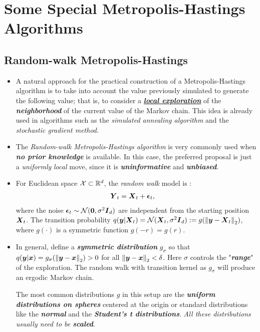 \documentclass[11pt]{article}
\begin{document}
\section{Some Special Metropolis-Hastings Algorithms}
\subsection{Random-walk Metropolis-Hastings}
\begin{itemize}
\item A natural approach for the practical construction of a Metropolis-Hastings algorithm is to take into account the value previously simulated to generate the following value; that is, to consider a \underline{\emph{\textbf{local exploration}}} of the \emph{\textbf{neighborhood}} of the current value of the Markov chain. This idea is already used in algorithms such as the \emph{simulated annealing algorithm} and the \emph{stochastic gradient method}. 

\item The \emph{Random-walk Metropolis-Hastings algorithm} is very commonly used when \emph{\textbf{no prior knowledge}} is available. In this case, the preferred proposal is just a \emph{uniformly} \emph{local} move, since it is \emph{\textbf{uninformative}} and \emph{\textbf{unbiased}}.

\item For Euclidean space ${\mathcal X} \subset {\mathbb R}^{d}$, the \emph{random walk} model is \citep{robert1999monte}:
\begin{align}
\boldsymbol{Y}_t &= \boldsymbol{X}_{t} + \boldsymbol{\epsilon}_{t}, \label{eqn: rw_model}
\end{align} where the noise $\boldsymbol{\epsilon}_{t} \sim {\mathcal N}(\boldsymbol{0}, \sigma^2\boldsymbol{I}_{d})$ are independent from the starting position $\boldsymbol{X}_{t}$. The transition probability $q(\boldsymbol{y}|\boldsymbol{X}_{t}) = {\mathcal N}(\boldsymbol{X}_{t}, \sigma^2\boldsymbol{I}_{d}) := g(\left\|\boldsymbol{y} - \boldsymbol{X}_{t}\right\|_{2})$, where $g(\cdot)$ is a symmetric function $g(-r) = g(r)$.  

\item In general, define a \emph{\textbf{symmetric distribution}} $g_{\sigma}$ so that $q(\boldsymbol{y}|\boldsymbol{x}) = g_{\sigma}(\left\|\boldsymbol{y} - \boldsymbol{x}\right\|_{2}) > 0$ for all $\left\|\boldsymbol{y} - \boldsymbol{x}\right\|_{2} < \delta$. Here $\sigma$ controls the "\emph{\textbf{range}}" of the exploration. The random walk with transition kernel as $g_{\sigma}$ will produce an ergodic Markov chain. 

The most common distributions $g$ in this setup are the \emph{\textbf{uniform distributions on spheres}} centered at the origin or standard distributions like the \emph{\textbf{normal}} and the \emph{\textbf{Student's t distributions}}. \emph{All these distributions usually need to be \textbf{scaled}}.



\end{itemize}
\end{document}
